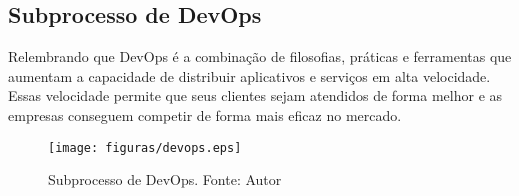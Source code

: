 \subsection{Subprocesso de DevOps}

Relembrando que DevOps é a combinação de filosofias, práticas e ferramentas que aumentam a capacidade de distribuir aplicativos e serviços em alta velocidade. Essas velocidade permite que seus clientes sejam atendidos de forma melhor e as empresas conseguem competir de forma mais eficaz no mercado.

\begin{figure}[H]
	\centering
  \texttt{[image: figuras/devops.eps]}
  \caption[Subprocesso de DevOps.]{Subprocesso de DevOps. Fonte: Autor}
	\label{fig:devops}
\end{figure}

